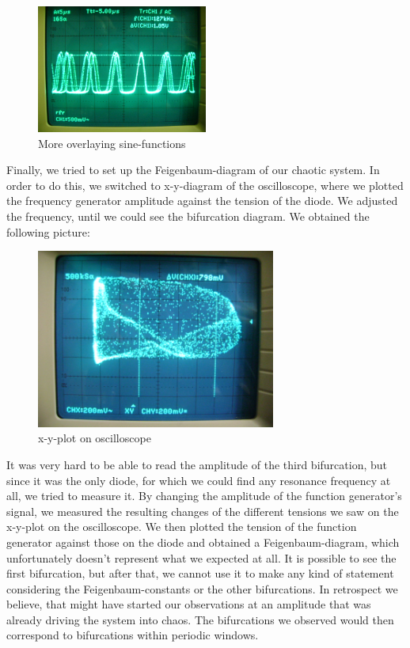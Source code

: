 \begin{figure}[H]
\centering \includegraphics[width=0.5\textwidth]{Fotos/03.JPG}
\caption{More overlaying sine-functions}
\end{figure}

Finally, we tried to set up the Feigenbaum-diagram of our chaotic system. In order to do this, we switched to x-y-diagram of the oscilloscope, where we plotted the frequency generator amplitude against the tension of the diode. We adjusted the frequency, until we could see the bifurcation diagram. We obtained the following picture:

\begin{figure}[H]
\centering \includegraphics[width= 0.7\textwidth]{Fotos/04.JPG}
\caption{x-y-plot on oscilloscope}
\end{figure}

It was very hard to be able to read the amplitude of the third bifurcation, but since it was the only diode, for which we could find any resonance frequency at all, we tried to measure it. By changing the amplitude of the function generator's signal, we measured the resulting changes of the different tensions we saw on the x-y-plot on the oscilloscope. We then plotted the tension of the function generator against those on the diode and obtained a Feigenbaum-diagram, which unfortunately doesn't represent what we expected at all. It is possible to see the first bifurcation, but after that, we cannot use it to make any kind of statement considering the Feigenbaum-constants or the other bifurcations. In retrospect we believe, that might have started our observations at an amplitude that was already driving the system into chaos. The bifurcations we observed would then correspond to bifurcations within periodic windows.

